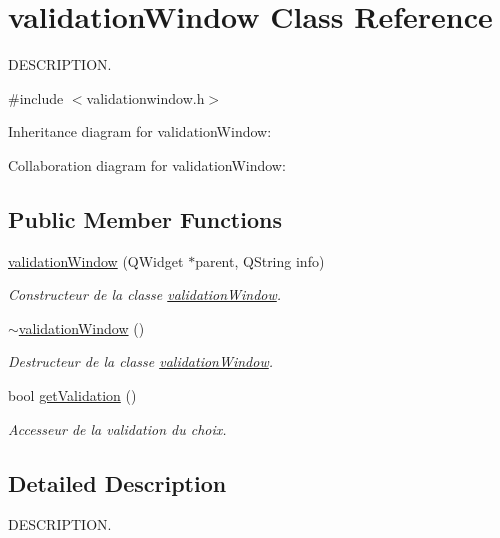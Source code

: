\hypertarget{classvalidation_window}{}\section{validation\+Window Class Reference}
\label{classvalidation_window}


D\+E\+S\+C\+R\+I\+P\+T\+I\+O\+N.  




{\ttfamily \#include $<$validationwindow.\+h$>$}



Inheritance diagram for validation\+Window\+:


Collaboration diagram for validation\+Window\+:
\subsection*{Public Member Functions}
\begin{DoxyCompactItemize}
\item 
\hyperlink{classvalidation_window_a3602e6f6f8729080b66e3e070ea440d8}{validation\+Window} (Q\+Widget $\ast$parent, Q\+String info)
\begin{DoxyCompactList}\small\item\em Constructeur de la classe \hyperlink{classvalidation_window}{validation\+Window}. \end{DoxyCompactList}\item 
\hyperlink{classvalidation_window_ab848535a1397cf308c817ec1225c119f}{$\sim$validation\+Window} ()
\begin{DoxyCompactList}\small\item\em Destructeur de la classe \hyperlink{classvalidation_window}{validation\+Window}. \end{DoxyCompactList}\item 
bool \hyperlink{classvalidation_window_aa12f94fa84e3149f834f24ef8b75eb40}{get\+Validation} ()
\begin{DoxyCompactList}\small\item\em Accesseur de la validation du choix. \end{DoxyCompactList}\end{DoxyCompactItemize}


\subsection{Detailed Description}
D\+E\+S\+C\+R\+I\+P\+T\+I\+O\+N. 

